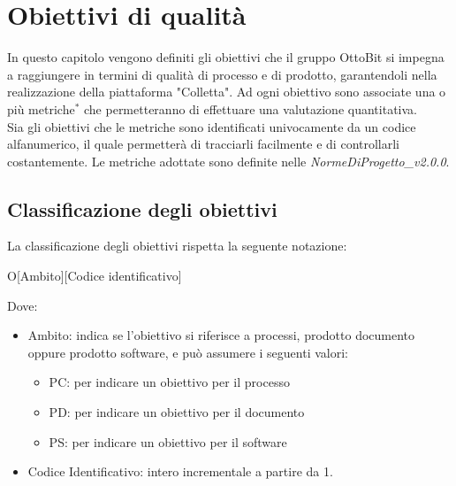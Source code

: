 \section{Obiettivi di qualità}
In questo capitolo vengono definiti gli obiettivi che il gruppo OttoBit si impegna a raggiungere in termini di qualità di processo e di prodotto, garantendoli nella realizzazione della piattaforma "Colletta". Ad ogni obiettivo sono associate una o più metriche$^*$ che permetteranno di effettuare una valutazione quantitativa. \\
Sia gli obiettivi che le metriche sono identificati univocamente da un codice alfanumerico, il quale permetterà di tracciarli facilmente e di controllarli costantemente. Le metriche adottate sono definite nelle \textit{NormeDiProgetto\_v2.0.0}.

\subsection{Classificazione degli obiettivi}
La classificazione degli obiettivi rispetta la seguente notazione:
\begin{center}
	O[Ambito][Codice identificativo]
\end{center}

Dove:
\begin{itemize}
	\item Ambito: indica se l'obiettivo si riferisce a processi, prodotto documento oppure prodotto software, e può assumere i seguenti valori:
	\begin{itemize}
		\item PC: per indicare un obiettivo per il processo
		\item PD: per indicare un obiettivo per il documento
		\item PS: per indicare un obiettivo per il software
	\end{itemize}
	
	\item Codice Identificativo: intero incrementale a partire da 1.
	
\end{itemize}

